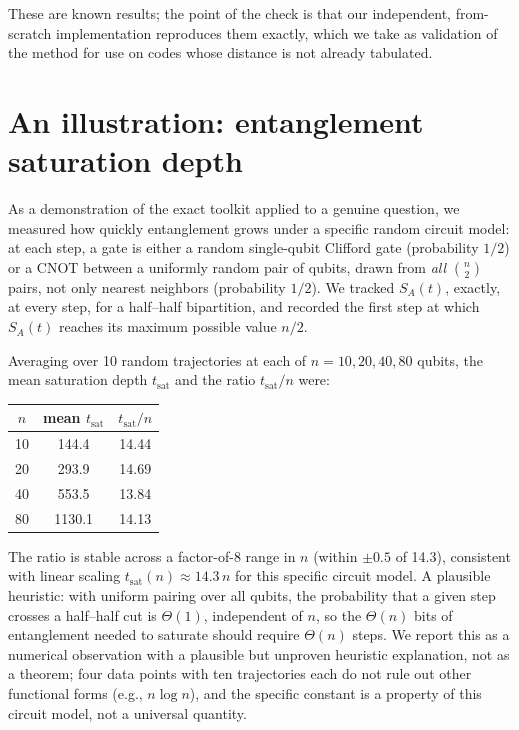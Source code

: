 \documentclass[11pt]{article}
\begin{document}
These are known results; the point of the check is that our
independent, from-scratch implementation reproduces them exactly, which
we take as validation of the method for use on codes whose distance is
not already tabulated.

\section{An illustration: entanglement saturation depth}

As a demonstration of the exact toolkit applied to a genuine question,
we measured how quickly entanglement grows under a specific random
circuit model: at each step, a gate is either a random single-qubit
Clifford gate (probability $1/2$) or a CNOT between a uniformly random
pair of qubits, drawn from \emph{all} $\binom{n}{2}$ pairs, not only
nearest neighbors (probability $1/2$). We tracked $S_A(t)$, exactly, at
every step, for a half--half bipartition, and recorded the first step
at which $S_A(t)$ reaches its maximum possible value $n/2$.

Averaging over 10 random trajectories at each of $n = 10, 20, 40, 80$
qubits, the mean saturation depth $t_{\text{sat}}$ and the ratio
$t_{\text{sat}}/n$ were:

\begin{center}
\begin{tabular}{ccc}
$n$ & mean $t_{\text{sat}}$ & $t_{\text{sat}}/n$ \\
\hline
10 & 144.4 & 14.44 \\
20 & 293.9 & 14.69 \\
40 & 553.5 & 13.84 \\
80 & 1130.1 & 14.13 \\
\end{tabular}
\end{center}

The ratio is stable across a factor-of-8 range in $n$ (within
$\pm 0.5$ of 14.3), consistent with linear scaling $t_{\text{sat}}(n)
\approx 14.3\, n$ for this specific circuit model. A plausible heuristic:
with uniform pairing over all qubits, the probability that a given step
crosses a half--half cut is $\Theta(1)$, independent of $n$, so the
$\Theta(n)$ bits of entanglement needed to saturate should require
$\Theta(n)$ steps. We report this as a numerical observation with a
plausible but unproven heuristic explanation, not as a theorem; four
data points with ten trajectories each do not rule out other functional
forms (e.g., $n\log n$), and the specific constant is a property of this
circuit model, not a universal quantity.
\end{document}

